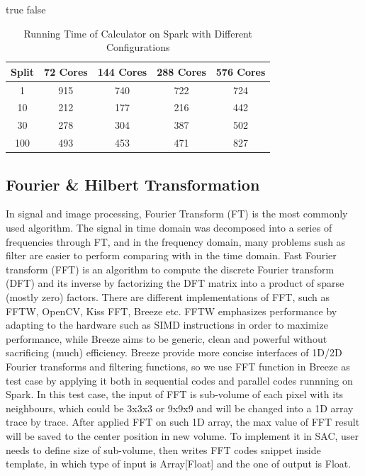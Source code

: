 \ifx true false
\begin{table}[H]
\caption{Running Time of Calculator on Spark with Different Configurations}
\centering
\begin{tabular}{||c| c c c c ||} 
 \hline
 Split & 72 Cores & 144 Cores & 288 Cores & 576 Cores \\ [0.5ex] 
 \hline
 1 & 915 & 740 & 722 & 724 \\ 
 10 & 212 & 177 & 216 & 442 \\
 30 & 278 & 304 & 387 & 502 \\
 100 & 493 & 453 & 471 & 827 \\
 \hline
\end{tabular}
\label{table:CalcSpark}
\end{table}
\fi

\subsection{Fourier \& Hilbert Transformation}
In signal and image processing, Fourier Transform (FT) is the most commonly used algorithm. The signal in time domain was decomposed into a series of frequencies  through FT, and in the frequency domain, many problems sush as filter are easier to perform comparing with in the time domain. Fast Fourier transform (FFT) \cite{FFTWiki} is an algorithm to compute the discrete Fourier transform (DFT) and its inverse by factorizing the DFT matrix into a product of sparse (mostly zero) factors. There are different implementations of FFT, such as FFTW, OpenCV, Kiss FFT, Breeze etc. FFTW\cite{FFTW05} emphasizes performance by adapting to the hardware such as SIMD instructions in order to maximize performance, while Breeze aims to be generic, clean and powerful without sacrificing (much) efficiency. Breeze provide more concise interfaces of 1D/2D Fourier transforms and filtering functions, so we use FFT function in Breeze as test case by applying it both in sequential codes and parallel codes runnning on Spark. In this test case, the input of FFT is sub-volume of each pixel with its neighbours, which could be 3x3x3 or 9x9x9 and will be changed into a 1D array trace by trace. After applied FFT on such 1D array, the max value of FFT result will be saved to the center position in new volume. To implement it in SAC, user needs to define size of sub-volume, then writes FFT codes snippet inside template, in which type of input is Array[Float] and the one of output is Float.   

